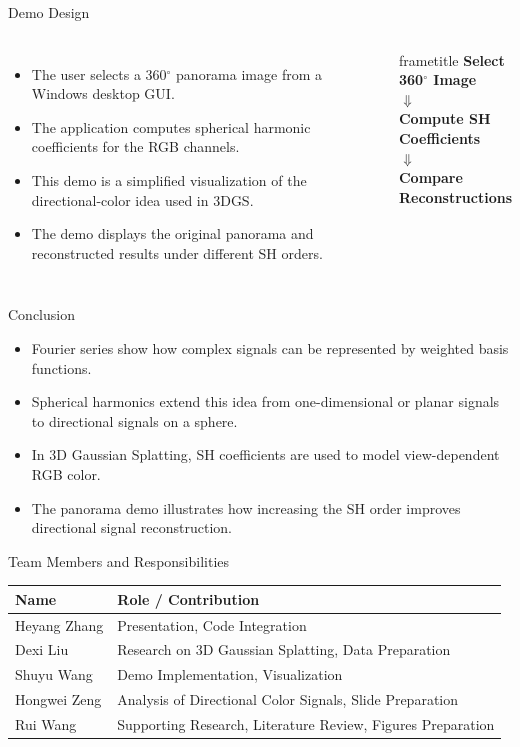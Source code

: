 \documentclass[aspectratio=169,10pt]{beamer}
\newcommand{\pipelinebox}[1]{
  \begin{beamercolorbox}[wd=\linewidth,sep=0.8em,rounded=true,center]{frametitle}
    \color{SCUGreen}\bfseries #1
  \end{beamercolorbox}
}
\begin{document}
\begin{frame}[t]{Demo Design}
  \justifying
  \begin{columns}[T]
    \begin{itemize}
      \item The user selects a 360$^\circ$ panorama image from a Windows desktop GUI.
      \item The application computes spherical harmonic coefficients for the RGB channels.
      \item This demo is a simplified visualization of the directional-color idea used in 3DGS.
      \item The demo displays the original panorama and reconstructed results under different SH orders.
    \end{itemize}

    \pipelinebox{
      Select 360$^\circ$ Image\\[0.2em]
      $\Downarrow$\\[0.2em]
      Compute SH Coefficients\\[0.2em]
      $\Downarrow$\\[0.2em]
      Compare Reconstructions
    }
  \end{columns}
\end{frame}




\begin{frame}[t]{Conclusion}
  \justifying
  \begin{itemize}
    \item Fourier series show how complex signals can be represented by weighted basis functions.
    \item Spherical harmonics extend this idea from one-dimensional or planar signals to directional signals on a sphere.
    \item In 3D Gaussian Splatting, SH coefficients are used to model view-dependent RGB color.
    \item The panorama demo illustrates how increasing the SH order improves directional signal reconstruction.
  \end{itemize}
\end{frame}

\begin{frame}[t]{Team Members and Responsibilities}
\centering
\begin{tabular}{l l}
\toprule
\textbf{Name} & \textbf{Role / Contribution} \\
\midrule
Heyang Zhang & Presentation, Code Integration \\
Dexi Liu & Research on 3D Gaussian Splatting, Data Preparation \\
Shuyu Wang & Demo Implementation, Visualization \\
Hongwei Zeng & Analysis of Directional Color Signals, Slide Preparation \\
Rui Wang  & Supporting Research, Literature Review, Figures Preparation \\
\bottomrule
\end{tabular}
\end{frame}
\end{document}
